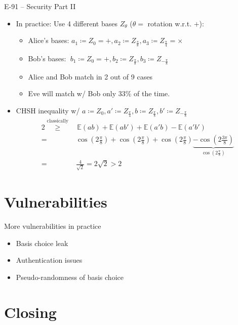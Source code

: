 \documentclass{beamer}
\begin{document}
	\begin{frame}{E-91 – Security Part II}
		\begin{itemize}
			\item In practice: Use 4 different bases $Z_\theta$ ($\theta =$ rotation w.r.t. $+$):
				\begin{itemize}
					\item Alice's bases: $a_1 \coloneqq Z_0 = +, a_2 \coloneqq Z_{\frac{\pi}{8}}, a_3 \coloneqq Z_{\frac{\pi}{4}} = \times$
					\item Bob's bases: $\;b_1 \coloneqq Z_0 = +, b_2 \coloneqq Z_{\frac{\pi}{8}}, b_3 \coloneqq Z_{-\frac{\pi}{8}}$
					\item Alice and Bob match in 2 out of 9 cases
					\item Eve will match w/ Bob only 33\% of the time.
				\end{itemize}
			\item<2-> CHSH inequality w/ $a \coloneqq Z_0, a' \coloneqq Z_{\frac{\pi}{4}}, b \coloneqq Z_{\frac{\pi}{8}}, b' \coloneqq Z_{-\frac{\pi}{8}}$
				\begin{align*}
					2 \overset{\text{classically}}{\geq}&\, \mathbb{E}(a b) + \mathbb{E}(a b') + \mathbb{E}(a' b) - \mathbb{E}(a' b') \\
					=& \cos(2\frac{\pi}{8}) + \cos(2\frac{\pi}{8}) + \cos(2\frac{\pi}{8}) \underbrace{- \cos(2\frac{3\pi}{8})}_{\cos(2\frac{\pi}{8})} \\
					=& \frac{4}{\sqrt{2}} = 2\sqrt{2} > 2
				\end{align*}
		\end{itemize}
	\end{frame}

	\section{Vulnerabilities}

	\begin{frame}{More vulnerabilities in practice} %
		\begin{itemize}
			\item Basis choice leak							
			\item Authentication issues
			\item Pseudo-randomness of basis choice
		\end{itemize}
	\end{frame}

	\section{Closing}
\end{document}
